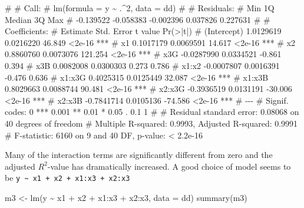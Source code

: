 \documentclass[
  a4paper,
]{article}
\newenvironment{Shaded}{\begin{snugshade}}{\end{snugshade}}
\newcommand{\AttributeTok}[1]{\textcolor[rgb]{0.77,0.63,0.00}{#1}}
\newcommand{\FunctionTok}[1]{\textcolor[rgb]{0.00,0.00,0.00}{#1}}
\newcommand{\NormalTok}[1]{#1}
\newcommand{\OtherTok}[1]{\textcolor[rgb]{0.56,0.35,0.01}{#1}}
\newcommand{\SpecialCharTok}[1]{\textcolor[rgb]{0.00,0.00,0.00}{#1}}
\theoremstyle{definition}
\theoremstyle{definition}
\theoremstyle{definition}
\theoremstyle{definition}
\theoremstyle{remark}
\begin{document}
\begin{myanswers}
\begin{Shaded}
\begin{Highlighting}[]
\NormalTok{\# }
\NormalTok{\# Call:}
\NormalTok{\# lm(formula = y \textasciitilde{} .\^{}2, data = dd)}
\NormalTok{\# }
\NormalTok{\# Residuals:}
\NormalTok{\#       Min        1Q    Median        3Q       Max }
\NormalTok{\# {-}0.139522 {-}0.058383 {-}0.002396  0.037826  0.227631 }
\NormalTok{\# }
\NormalTok{\# Coefficients:}
\NormalTok{\#               Estimate Std. Error t value Pr(\textgreater{}|t|)    }
\NormalTok{\# (Intercept)  1.0129619  0.0216220  46.849   \textless{}2e{-}16 ***}
\NormalTok{\# x1           0.1017179  0.0069591  14.617   \textless{}2e{-}16 ***}
\NormalTok{\# x2           0.8860760  0.0073076 121.254   \textless{}2e{-}16 ***}
\NormalTok{\# x3G         {-}0.0287990  0.0334521  {-}0.861    0.394    }
\NormalTok{\# x3B          0.0082008  0.0300303   0.273    0.786    }
\NormalTok{\# x1:x2       {-}0.0007807  0.0016391  {-}0.476    0.636    }
\NormalTok{\# x1:x3G       0.4025315  0.0125449  32.087   \textless{}2e{-}16 ***}
\NormalTok{\# x1:x3B       0.8029663  0.0088744  90.481   \textless{}2e{-}16 ***}
\NormalTok{\# x2:x3G      {-}0.3936519  0.0131191 {-}30.006   \textless{}2e{-}16 ***}
\NormalTok{\# x2:x3B      {-}0.7841714  0.0105136 {-}74.586   \textless{}2e{-}16 ***}
\NormalTok{\# {-}{-}{-}}
\NormalTok{\# Signif. codes:  0 \textquotesingle{}***\textquotesingle{} 0.001 \textquotesingle{}**\textquotesingle{} 0.01 \textquotesingle{}*\textquotesingle{} 0.05 \textquotesingle{}.\textquotesingle{} 0.1 \textquotesingle{} \textquotesingle{} 1}
\NormalTok{\# }
\NormalTok{\# Residual standard error: 0.08068 on 40 degrees of freedom}
\NormalTok{\# Multiple R{-}squared:  0.9993,  Adjusted R{-}squared:  0.9991 }
\NormalTok{\# F{-}statistic:  6160 on 9 and 40 DF,  p{-}value: \textless{} 2.2e{-}16}
\end{Highlighting}
\end{Shaded}

Many of the interaction terms are significantly
different from zero and the adjusted \(R^2\)-value has
dramatically increased. A good choice of model seems
to be \texttt{y\ \textasciitilde{}\ x1\ +\ x2\ +\ x1:x3\ +\ x2:x3}

\begin{Shaded}
\begin{Highlighting}[]
\NormalTok{m3 }\OtherTok{\textless{}{-}} \FunctionTok{lm}\NormalTok{(y }\SpecialCharTok{\textasciitilde{}}\NormalTok{ x1 }\SpecialCharTok{+}\NormalTok{ x2 }\SpecialCharTok{+}\NormalTok{ x1}\SpecialCharTok{:}\NormalTok{x3 }\SpecialCharTok{+}\NormalTok{ x2}\SpecialCharTok{:}\NormalTok{x3, }\AttributeTok{data =}\NormalTok{ dd)}
\FunctionTok{summary}\NormalTok{(m3)}
\end{Highlighting}
\end{Shaded}


\end{myanswers}
\end{document}
